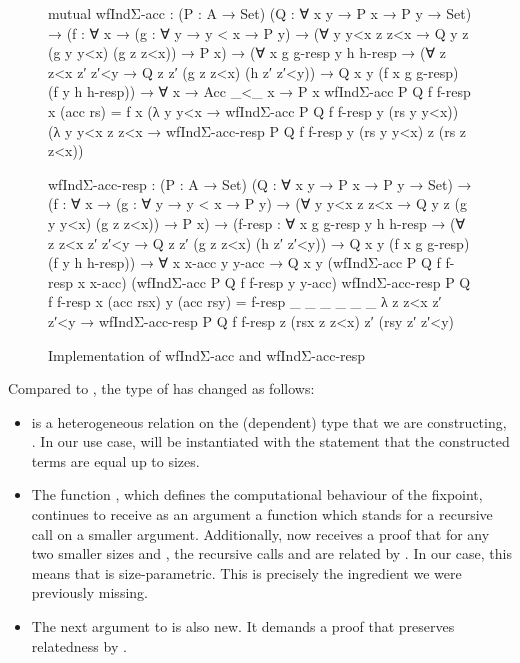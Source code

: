 \begin{figure}
  \centering
\begin{code}
mutual
  wfIndΣ-acc : (P : A → Set) (Q : ∀ x y → P x → P y → Set)
    → (f : ∀ x
        → (g : ∀ y → y < x → P y)
        → (∀ y y<x z z<x → Q y z (g y y<x) (g z z<x))
        → P x)
    → (∀ x g g-resp y h h-resp
        → (∀ z z<x z′ z′<y → Q z z′ (g z z<x) (h z′ z′<y))
        → Q x y (f x g g-resp) (f y h h-resp))
    → ∀ x → Acc _<_ x → P x
  wfIndΣ-acc P Q f f-resp x (acc rs)
    = f x
      (λ y y<x → wfIndΣ-acc P Q f f-resp y (rs y y<x))
      (λ y y<x z z<x
          → wfIndΣ-acc-resp P Q f f-resp y (rs y y<x) z (rs z z<x))

  wfIndΣ-acc-resp : (P : A → Set) (Q : ∀ x y → P x → P y → Set)
    → (f : ∀ x
        → (g : ∀ y → y < x → P y)
        → (∀ y y<x z z<x → Q y z (g y y<x) (g z z<x))
        → P x)
    → (f-resp : ∀ x g g-resp y h h-resp
        → (∀ z z<x z′ z′<y → Q z z′ (g z z<x) (h z′ z′<y))
        → Q x y (f x g g-resp) (f y h h-resp))
    → ∀ x x-acc y y-acc
    → Q x y
        (wfIndΣ-acc P Q f f-resp x x-acc)
        (wfIndΣ-acc P Q f f-resp y y-acc)
  wfIndΣ-acc-resp P Q f f-resp x (acc rsx) y (acc rsy)
    = f-resp _ _ _ _ _ _ λ z z<x z′ z′<y
        → wfIndΣ-acc-resp P Q f f-resp z (rsx z z<x) z′ (rsy z′ z′<y)
\end{code}

  \caption{Implementation of wfIndΣ-acc and wfIndΣ-acc-resp}
  \label{fig:wfIndΣ}
\end{figure}

Compared to , the type of  has changed as
follows:
\begin{itemize}
  \item {} is a heterogeneous relation on the (dependent) type that we
    are constructing, . In our use case,  will be instantiated
    with the statement that the constructed terms are equal up to sizes.
  \item The function , which defines the computational behaviour of the
    fixpoint, continues to receive as an argument a function  which
    stands for a recursive call on a smaller argument. Additionally, 
    now receives a proof that for any two smaller sizes  and ,
    the recursive calls  and  are related by . In
    our case, this means that  is size-parametric. This is precisely
    the ingredient we were previously missing.
  \item The next argument to  is also new. It demands a proof
    that  preserves relatedness by .
\end{itemize}


